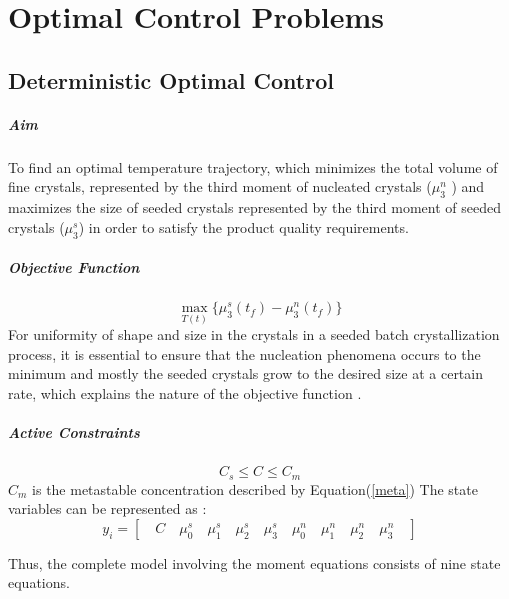 \chapter{Optimal Control Problems}

\section{Deterministic Optimal Control} \label{deterministic}


\paragraph{Aim}
To find an optimal temperature trajectory, which minimizes the total volume of fine crystals, represented by the third moment of nucleated crystals ($\mu_{3}^{n}$ ) and maximizes the size of seeded crystals represented by the third moment of seeded crystals ($\mu_{3}^{s}$) in order to satisfy the product quality requirements.

\paragraph{Objective Function}
\begin{equation*}
\max_{T(t)}\lbrace{\mu_{3}^{s}(t_{f}) - \mu_{3}^{n}(t_{f})\rbrace } 
\end{equation*}
For uniformity of shape and size in the crystals in a seeded batch crystallization process, it is essential to ensure that the nucleation phenomena occurs to the minimum and mostly the seeded crystals grow to the desired size at a certain rate, which explains the nature of the objective function .

\paragraph{Active Constraints}
\begin{equation*}
C_{s}\leqslant C \leqslant C_{m}
\end{equation*}
$C_{m}$ is the metastable concentration described by Equation(\ref{meta})
The state variables can be represented as :
\begin{equation*}
y_{i} = \left[\quad C \quad \mu_{0}^{s} \quad \mu_{1}^{s}\quad \mu_{2}^{s}\quad \mu_{3}^{s}\quad \mu_{0}^{n}\quad \mu_{1}^{n}\quad \mu_{2}^{n}\quad \mu_{3}^{n}\quad\right]  
\end{equation*}

Thus, the complete model involving the moment equations consists of nine state equations. 

